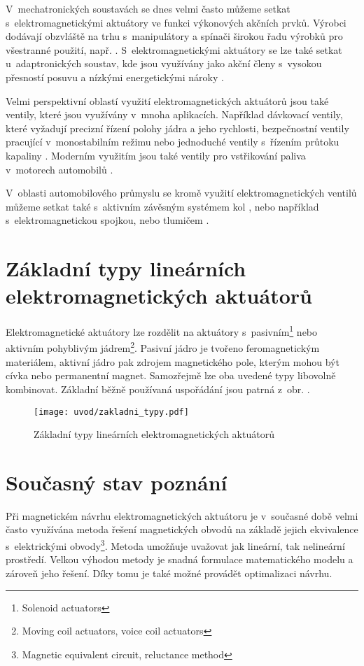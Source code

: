V~mechatronických soustavách se dnes velmi často můžeme setkat s~elektromagnetickými aktuátory ve funkci výkonových akčních prvků. Výrobci dodávají obzvláště na trhu s~manipulátory a spínači širokou řadu výrobků pro všestranné použití, např. \cite{standardtechnologyinc.com} \cite{etogroup.com}. S~elektromagnetickými aktuátory se lze také setkat u~adaptronických soustav, kde jsou využívány jako akční členy s~vysokou přesností posuvu a nízkými energetickými nároky \cite{4134969} \cite{1252843} \cite{GomisBellmunt2007153} \cite{Lee200024}.

Velmi perspektivní oblastí využití elektromagnetických aktuátorů jsou také ventily, které jsou využívány v~mnoha aplikacích. Například dávkovací ventily, které vyžadují precizní řízení polohy jádra a jeho rychlosti, bezpečnostní ventily pracující v~monostabilním režimu nebo jednoduché ventily s~řízením průtoku kapaliny \cite{nesbitt2011handbook} \cite{5953509}. Moderním využitím jsou také ventily pro vstřikování paliva v~motorech automobilů \cite{1406108} \cite{6531035}.

V~oblasti automobilového průmyslu se kromě využití elektromagnetických ventilů můžeme setkat také s~aktivním závěsným systémem kol \cite{4677555}, nebo například s~elektromagnetickou spojkou, nebo tlumičem \cite{gysen2010active}.


\section{Základní typy lineárních\\ elektromagnetických aktuátorů}
Elektromagnetické aktuátory lze rozdělit na aktuátory s~pasivním\footnote{Solenoid actuators} nebo aktivním pohyblivým jádrem\footnote{Moving coil actuators, voice coil actuators}. Pasivní jádro je tvořeno feromagnetickým materiálem, aktivní jádro pak zdrojem magnetického pole, kterým mohou být cívka nebo permanentní magnet. Samozřejmě lze oba uvedené typy libovolně kombinovat. Základní běžně používaná uspořádání jsou patrná z~obr. . \cite{gomis2010design} \cite{ulrych2009aktuatory}

\begin{figure}[h!]
  \centering
  \texttt{[image: uvod/zakladni\_typy.pdf]}
  \caption{Základní typy lineárních elektromagnetických aktuátorů}
  \label{obr:zakladni_typy}
\end{figure}

\section{Současný stav poznání}
Při magnetickém návrhu elektromagnetických aktuátoru je v~současné době velmi často využívána metoda řešení magnetických obvodů na základě jejich ekvivalence s~elektrickými obvody\footnote{Magnetic equivalent circuit, reluctance method}. Metoda umožňuje uvažovat jak lineární, tak nelineární prostředí. Velkou výhodou metody je snadná formulace matematického modelu a zároveň jeho řešení. Díky tomu je také možné provádět optimalizaci návrhu. \cite{gomis2010design} \cite{4270652}

